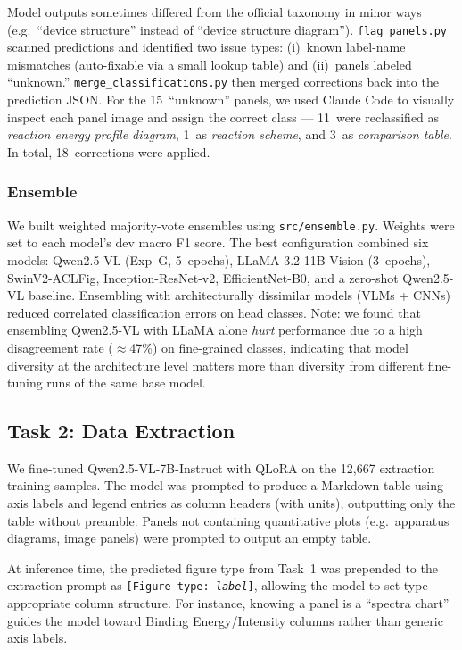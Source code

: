 \documentclass[11pt]{tibop-article}
\begin{document}
Model outputs sometimes differed from the official taxonomy in minor ways
(e.g.\ ``device structure'' instead of ``device structure diagram'').
\texttt{flag\_panels.py} scanned predictions and identified two issue types:
(i)~known label-name mismatches (auto-fixable via a small lookup table) and
(ii)~panels labeled ``unknown.''
\texttt{merge\_classifications.py} then merged corrections back into the
prediction JSON.
For the 15~``unknown'' panels, we used Claude Code to visually inspect each
panel image and assign the correct class --- 11~were reclassified as
\textit{reaction energy profile diagram}, 1~as \textit{reaction scheme}, and
3~as \textit{comparison table}.
In total, 18~corrections were applied.

\subsubsection{Ensemble}
\label{sec:ensemble}

We built weighted majority-vote ensembles using \texttt{src/ensemble.py}.
Weights were set to each model's dev macro F1 score.
The best configuration combined six models: Qwen2.5-VL (Exp~G, 5~epochs),
LLaMA-3.2-11B-Vision (3~epochs), SwinV2-ACLFig, Inception-ResNet-v2,
EfficientNet-B0, and a zero-shot Qwen2.5-VL baseline.
Ensembling with architecturally dissimilar models (VLMs + CNNs) reduced
correlated classification errors on head classes.
Note: we found that ensembling Qwen2.5-VL with LLaMA alone \emph{hurt} performance
due to a high disagreement rate ($\approx$47\%) on fine-grained classes, indicating
that model diversity at the architecture level matters more than diversity from
different fine-tuning runs of the same base model.

\subsection{Task 2: Data Extraction}

We fine-tuned Qwen2.5-VL-7B-Instruct with QLoRA on the 12,667 extraction
training samples.
The model was prompted to produce a Markdown table using axis labels and legend
entries as column headers (with units), outputting only the table without
preamble.
Panels not containing quantitative plots (e.g.\ apparatus diagrams, image panels)
were prompted to output an empty table.

At inference time, the predicted figure type from Task~1 was prepended to the
extraction prompt as \texttt{[Figure type: \textit{label}]}, allowing the model
to set type-appropriate column structure.
For instance, knowing a panel is a ``spectra chart'' guides the model toward
Binding Energy/Intensity columns rather than generic axis labels.
\end{document}
